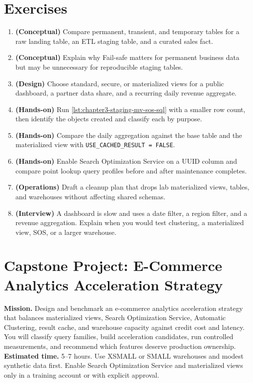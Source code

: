 \section{Exercises}
\begin{enumerate}
    \item \textbf{(Conceptual)} Compare permanent, transient, and temporary tables for a raw landing table, an ETL staging table, and a curated sales fact.
    \item \textbf{(Conceptual)} Explain why Fail-safe matters for permanent business data but may be unnecessary for reproducible staging tables.
    \item \textbf{(Design)} Choose standard, secure, or materialized views for a public dashboard, a partner data share, and a recurring daily revenue aggregate.
    \item \textbf{(Hands-on)} Run \cref{lst:chapter3-staging-mv-sos-sql} with a smaller row count, then identify the objects created and classify each by purpose.
    \item \textbf{(Hands-on)} Compare the daily aggregation against the base table and the materialized view with \texttt{USE\_CACHED\_RESULT = FALSE}.
    \item \textbf{(Hands-on)} Enable Search Optimization Service on a UUID column and compare point lookup query profiles before and after maintenance completes.
    \item \textbf{(Operations)} Draft a cleanup plan that drops lab materialized views, tables, and warehouses without affecting shared schemas.
    \item \textbf{(Interview)} A dashboard is slow and uses a date filter, a region filter, and a revenue aggregation. Explain when you would test clustering, a materialized view, SOS, or a larger warehouse.
\end{enumerate}
\section{Capstone Project: E-Commerce Analytics Acceleration Strategy}\label{sec:ch3-capstone}
\begin{capstonebox}
\textbf{Mission.} Design and benchmark an e-commerce analytics acceleration strategy that balances materialized views, Search Optimization Service, Automatic Clustering, result cache, and warehouse capacity against credit cost and latency. You will classify query families, build acceleration candidates, run controlled measurements, and recommend which features deserve production ownership.
\textbf{Estimated time.} 5--7 hours. Use XSMALL or SMALL warehouses and modest synthetic data first. Enable Search Optimization Service and materialized views only in a training account or with explicit approval.
\end{capstonebox}
